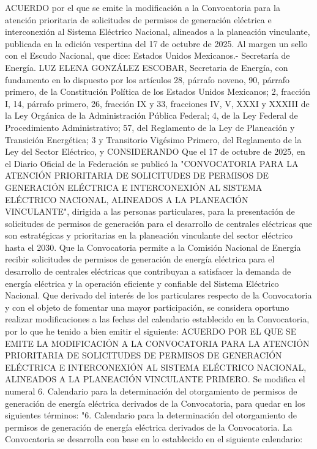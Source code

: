 \begingroup
\senertexto
ACUERDO por el que se emite la modificación a la Convocatoria para la atención prioritaria de solicitudes de permisos de generación eléctrica e interconexión al Sistema Eléctrico Nacional, alineados a la planeación vinculante, publicada en la edición vespertina del 17 de octubre de 2025.
Al margen un sello con el Escudo Nacional, que dice: Estados Unidos Mexicanos.- Secretaría de Energía.
LUZ ELENA GONZÁLEZ ESCOBAR, Secretaria de Energía, con fundamento en lo dispuesto por los artículos 28, párrafo noveno, 90, párrafo primero, de la Constitución Política de los Estados Unidos Mexicanos; 2, fracción I, 14, párrafo primero, 26, fracción IX y 33, fracciones IV, V, XXXI y XXXIII de la Ley Orgánica de la Administración Pública Federal; 4, de la Ley Federal de Procedimiento Administrativo; 57, del Reglamento de la Ley de Planeación y Transición Energética; 3 y Transitorio Vigésimo Primero, del Reglamento de la Ley del Sector Eléctrico, y
CONSIDERANDO
Que el 17 de octubre de 2025, en el Diario Oficial de la Federación se publicó la "CONVOCATORIA PARA LA ATENCIÓN PRIORITARIA DE SOLICITUDES DE PERMISOS DE GENERACIÓN ELÉCTRICA E INTERCONEXIÓN AL SISTEMA ELÉCTRICO NACIONAL, ALINEADOS A LA PLANEACIÓN VINCULANTE", dirigida a las personas particulares, para la presentación de solicitudes de permisos de generación para el desarrollo de centrales eléctricas que son estratégicas y prioritarias en la planeación vinculante del sector eléctrico hasta el 2030.
Que la Convocatoria permite a la Comisión Nacional de Energía recibir solicitudes de permisos de generación de energía eléctrica para el desarrollo de centrales eléctricas que contribuyan a satisfacer la demanda de energía eléctrica y la operación eficiente y confiable del Sistema Eléctrico Nacional.
Que derivado del interés de los particulares respecto de la Convocatoria y con el objeto de fomentar una mayor participación, se considera oportuno realizar modificaciones a las fechas del calendario establecido en la Convocatoria, por lo que he tenido a bien emitir el siguiente:
ACUERDO POR EL QUE SE EMITE LA MODIFICACIÓN A LA CONVOCATORIA PARA LA ATENCIÓN PRIORITARIA DE SOLICITUDES DE PERMISOS DE GENERACIÓN ELÉCTRICA E INTERCONEXIÓN AL SISTEMA ELÉCTRICO NACIONAL, ALINEADOS A LA PLANEACIÓN VINCULANTE
PRIMERO. Se modifica el numeral 6. Calendario para la determinación del otorgamiento de permisos de generación de energía eléctrica derivados de la Convocatoria, para quedar en los siguientes términos: 
"6. Calendario para la determinación del otorgamiento de permisos de generación de energía eléctrica derivados de la Convocatoria.
La Convocatoria se desarrolla con base en lo establecido en el siguiente calendario:

